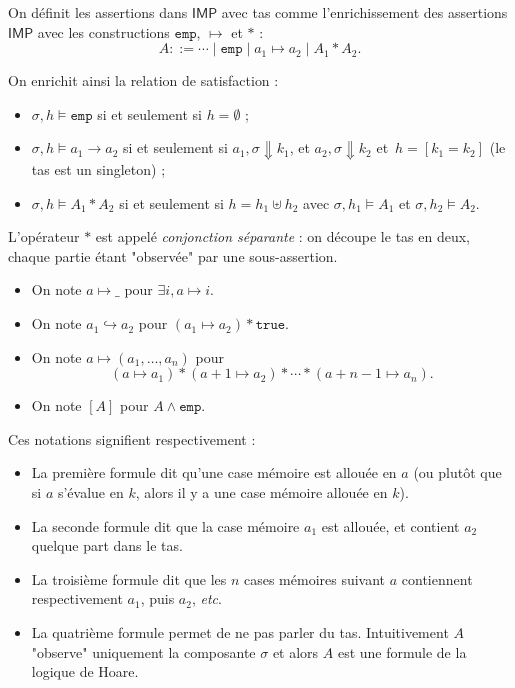 \documentclass[../main]{subfiles}
\begin{document}
  \begin{defn}
    On définit les assertions dans $\mathsf{IMP}$ avec tas comme l'enrichissement des assertions $\mathsf{IMP}$ avec les constructions $\mathtt{emp}$, $\mapsto$ et $*$ :
    \[
      A ::= {\cdots}  \mid \mathtt{emp}  \mid a_1 \mapsto a_2  \mid A_1 * A_2
    .\]

    On enrichit ainsi la relation de satisfaction :
    \begin{itemize}
      \item $\sigma, h \models \mathtt{emp}$ si et seulement si $h = \emptyset$ ;
      \item $\sigma, h \models a_1 \to a_2$ si et seulement si $a_1, \sigma \Downarrow k_1$, et $a_2, \sigma \Downarrow k_2$ et~$h = [k_1 = k_2]$ (le tas est un singleton) ;
      \item $\sigma, h \models A_1 * A_2$ si et seulement si $h = h_1 \uplus h_2$ avec $\sigma, h_1 \models A_1$ et $\sigma, h_2 \models A_2$.
    \end{itemize}
  \end{defn}

  L’opérateur $*$ est appelé \textit{conjonction séparante} : on découpe le tas en deux, chaque partie étant "observée" par une sous-assertion.

  \begin{note}[Notations]
    \begin{itemize}
      \item On note $a \mapsto \texttt{\_}$ pour $\exists i, a \mapsto i$.
      \item On note $a_1 \hookrightarrow a_2$ pour $(a_1 \mapsto a_2) * \mathtt{true}$.
      \item On note $a \mapsto (a_1, \ldots, a_n)$ pour \[
          (a \mapsto a_1) * (a + 1 \mapsto a_2) * \cdots * (a + n - 1 \mapsto a_n)
        .\]
      \item On note $[A]$ pour $A \land \mathtt{emp}$.
    \end{itemize}
  \end{note}
  Ces notations signifient respectivement :
  \begin{itemize}
    \item La première formule dit qu'une case mémoire est allouée en $a$ (ou plutôt que si $a$ s'évalue en $k$, alors il y a une case mémoire allouée en $k$).
    \item La seconde formule dit que la case mémoire $a_1$ est allouée, et contient $a_2$ quelque part dans le tas.
    \item La troisième formule dit que les $n$ cases mémoires suivant $a$ contiennent respectivement $a_1$, puis $a_2$, \textit{etc}.
    \item La quatrième formule permet de ne pas parler du tas. Intuitivement $A$ "observe" uniquement la composante $\sigma$ et alors $A$ est une formule de la logique de Hoare.
  \end{itemize}
\end{document}
